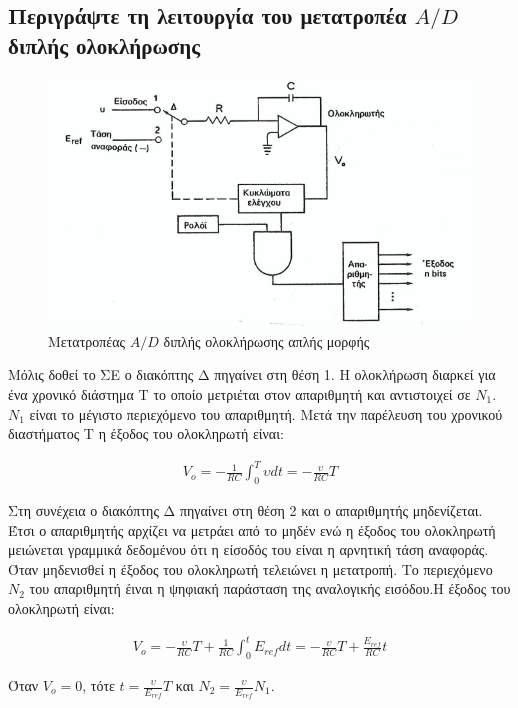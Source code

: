 \documentclass{article}
\begin{document}
\subsection{Περιγράψτε τη λειτουργία του μετατροπέα $A/D$ διπλής ολοκλήρωσης}
\newpage

\begin{figure}[h!]
    \includegraphics[width=\linewidth]{AD2olok.png}
    \caption{Μετατροπέας $A/D$ διπλής ολοκλήρωσης απλής μορφής}
\end{figure}
Μόλις δοθεί το ΣΕ ο διακόπτης Δ πηγαίνει στη θέση 1. Η ολοκλήρωση διαρκεί για ένα χρονικό διάστημα Τ το οποίο μετριέται στον απαριθμητή και αντιστοιχεί σε $Ν_1$. $Ν_1$ είναι το μέγιστο 
περιεχόμενο του απαριθμητή. Μετά την παρέλευση του χρονικού διαστήματος Τ η έξοδος του ολοκληρωτή είναι: 

\begin{align*}
    V_o=-\frac{1}{RC}\int^{T}_{0} \upsilon dt=-\frac{\upsilon}{RC}T
\end{align*}

Στη συνέχεια ο διακόπτης Δ πηγαίνει στη θέση 2 και ο απαριθμητής μηδενίζεται. Έτσι ο απαριθμητής αρχίζει να μετράει από το μηδέν ενώ η έξοδος του ολοκληρωτή μειώνεται γραμμικά δεδομένου
ότι η είσοδός του είναι η αρνητική τάση αναφοράς. Όταν μηδενισθεί η έξοδος του ολοκληρωτή τελειώνει η μετατροπή. Το περιεχόμενο $Ν_2$ του απαριθμητή έιναι η ψηφιακή παράσταση της 
αναλογικής εισόδου.Η έξοδος του ολοκληρωτή είναι: 

\begin{align*}
    V_o = -\frac{\upsilon}{RC}T + \frac{1}{RC} \int^t_0 E_{ref}dt = - \frac{\upsilon}{RC}T + \frac{E_{ref}}{RC}t
\end{align*}

Όταν $V_o = 0$, τότε $t=\frac{\upsilon}{E_{ref}}T$ και $N_2=\frac{\upsilon}{E_{ref}}N_1$.
\end{document}
